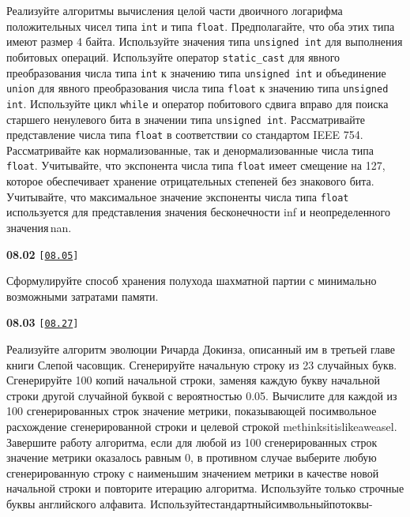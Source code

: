 \documentclass[a4paper,12pt]{article}
\begin{document}
Реализуйте алгоритмы вычисления целой части двоичного логарифма положительных чисел типа \lstinline{int} и типа \lstinline{float}. Предполагайте, что оба этих типа имеют размер 4 байта. Используйте значения типа \lstinline{unsigned int} для выполнения побитовых операций. Используйте оператор \lstinline{static_cast} для явного преобразования числа типа \lstinline{int} к значению типа \lstinline{unsigned int} и объединение \lstinline{union} для явного преобразования числа типа \lstinline{float} к значению типа \lstinline{unsigned int}. Используйте цикл \lstinline{while} и оператор побитового сдвига вправо для поиска старшего ненулевого бита в значении типа \lstinline{unsigned int}. Рассматривайте представление числа типа \lstinline{float} в соответствии со стандартом IEEE 754. Рассматривайте как нормализованные, так и денормализованные числа типа \lstinline{float}. Учитывайте, что экспонента числа типа \lstinline{float} имеет смещение на 127, которое обеспечивает хранение отрицательных степеней без знакового бита. Учитывайте, что максимальное значение экспоненты числа типа \lstinline{float} используется для представления значения бесконечности inf и неопределенного значения\,nan.

\bigskip

{\large \textbf{08.02} \texttt{[\href{https://github.com/i-s-m-mipt/Education/blob/master/projects/examples/source/08.05.cpp}{\texttt{08.05}}]}}

\bigskip

Сформулируйте способ хранения полухода шахматной партии с минимально возможными затратами памяти.

\bigskip

{\large \textbf{08.03} \texttt{[\href{https://github.com/i-s-m-mipt/Education/blob/master/projects/examples/source/08.27.cpp}{\texttt{08.27}}]}}

\bigskip

Реализуйте алгоритм эволюции Ричарда Докинза, описанный им в третьей главе книги Слепой часовщик. Сгенерируйте начальную строку из 23 случайных букв. Сгенерируйте 100 копий начальной строки, заменяя каждую букву начальной строки другой случайной буквой с вероятностью 0.05. Вычислите для каждой из 100 сгенерированных строк значение метрики, показывающей посимвольное расхождение сгенерированной строки и целевой строкой methinksitislikeaweasel. Завершите работу алгоритма, если для любой из 100 сгенерированных строк значение метрики оказалось равным 0, в противном случае выберите любую сгенерированную строку с наименьшим значением метрики в качестве новой начальной строки и повторите итерацию алгоритма. Используйте только строчные буквы английского алфавита. Используйте\;стандартный\;символьный\;поток\;вы- 
\end{document}
